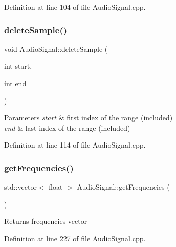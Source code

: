 Definition at line 104 of file Audio\+Signal.\+cpp.

\mbox{\label{class_audio_signal_a0c12f9dab81440c887138f8308d5f3b6}} 
\subsubsection{\texorpdfstring{delete\+Sample()}{deleteSample()}\hspace{0.1cm}{\footnotesize\ttfamily [2/2]}}
{\footnotesize\ttfamily void Audio\+Signal\+::delete\+Sample (\begin{DoxyParamCaption}\item[{int}]{start,  }\item[{int}]{end }\end{DoxyParamCaption})}


\begin{DoxyParams}{Parameters}
{\em start} & first index of the range (included) \\
\hline
{\em end} & last index of the range (included) \\
\hline
\end{DoxyParams}


Definition at line 114 of file Audio\+Signal.\+cpp.

\mbox{\label{class_audio_signal_a4e45a4b1adc16a9cbd65501efafb6ded}} 
\subsubsection{\texorpdfstring{get\+Frequencies()}{getFrequencies()}\hspace{0.1cm}{\footnotesize\ttfamily [1/2]}}
{\footnotesize\ttfamily std\+::vector$<$ float $>$ Audio\+Signal\+::get\+Frequencies (\begin{DoxyParamCaption}{ }\end{DoxyParamCaption})}

\begin{DoxyReturn}{Returns}
frequencies vector 
\end{DoxyReturn}


Definition at line 227 of file Audio\+Signal.\+cpp.

